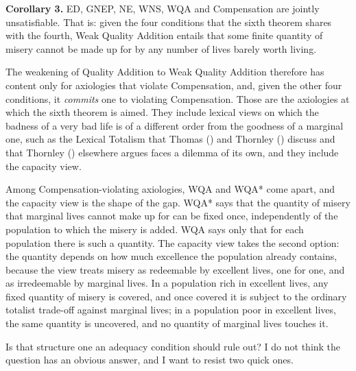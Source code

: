 \documentclass[
  11pt,
  letterpaper,
  DIV=11,
  numbers=noendperiod,
  twoside]{scrartcl}
\begin{document}
\textbf{Corollary 3.} ED, GNEP, NE, WNS, WQA and Compensation are
jointly unsatisfiable. That is: given the four conditions that the sixth
theorem shares with the fourth, Weak Quality Addition entails that some
finite quantity of misery cannot be made up for by any number of lives
barely worth living.

The weakening of Quality Addition to Weak Quality Addition therefore has
content only for axiologies that violate Compensation, and, given the
other four conditions, it \emph{commits} one to violating Compensation.
Those are the axiologies at which the sixth theorem is aimed. They
include lexical views on which the badness of a very bad life is of a
different order from the goodness of a marginal one, such as the Lexical
Totalism that Thomas () and Thornley
() discuss and that Thornley
() elsewhere argues faces a dilemma of
its own, and they include the capacity view.

Among Compensation-violating axiologies, WQA and WQA* come apart, and
the capacity view is the shape of the gap. WQA* says that the quantity
of misery that marginal lives cannot make up for can be fixed once,
independently of the population to which the misery is added. WQA says
only that for each population there is such a quantity. The capacity
view takes the second option: the quantity depends on how much
excellence the population already contains, because the view treats
misery as redeemable by excellent lives, one for one, and as
irredeemable by marginal lives. In a population rich in excellent lives,
any fixed quantity of misery is covered, and once covered it is subject
to the ordinary totalist trade-off against marginal lives; in a
population poor in excellent lives, the same quantity is uncovered, and
no quantity of marginal lives touches it.

Is that structure one an adequacy condition should rule out? I do not
think the question has an obvious answer, and I want to resist two quick
ones.
\end{document}

